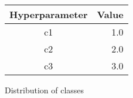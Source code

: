 
\begin{figure}[H]
{\centering
	\begin{tabular}{| c | r |}
		\hline
	
		\textbf{Hyperparameter} & \textbf{Value} \\ \hline
		c1 & 1.0 \\ \hline
		c2 & 2.0 \\ \hline
		c3 & 3.0 \\ \hline
	
	\end{tabular}
	\caption{Distribution of classes}
	\label{fig:neat-hyper}
}
\end{figure}
